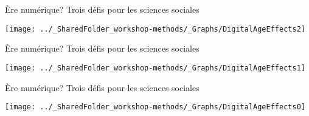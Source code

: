 \documentclass{beamer}
\begin{document}
\begin{frame}{Ère numérique? Trois défis pour les sciences sociales}
\vspace{1cm}
    \begin{center}
        \texttt{[image: ../\_SharedFolder\_workshop-methods/\_Graphs/DigitalAgeEffects2]}
    \end{center}
\end{frame}


\begin{frame}{Ère numérique? Trois défis pour les sciences sociales}
\vspace{1cm}
    \begin{center}
        \texttt{[image: ../\_SharedFolder\_workshop-methods/\_Graphs/DigitalAgeEffects1]}
    \end{center}
\end{frame}

\begin{frame}{Ère numérique? Trois défis pour les sciences sociales}
\vspace{1cm}
    \begin{center}
        \texttt{[image: ../\_SharedFolder\_workshop-methods/\_Graphs/DigitalAgeEffects0]}
    \end{center}
\end{frame}




\end{document}
